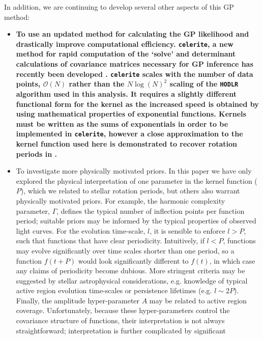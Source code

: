 \documentclass[a4paper,fleqn,usenatbib,useAMS]{mnras}
\begin{document}
In addition, we are continuing to develop several other aspects of this GP
method:
\begin{itemize}
    \item{{\bf To use an updated method for calculating the GP likelihood and
    drastically improve computational efficiency.
        {\tt celerite}, a new method for rapid computation of the `solve' and
        determinant calculations of covariance matrices necessary for GP
        inference has recently been developed \citep{Foremanmackey2017}.
        {\tt celerite} scales with the number of data points, $\mathcal{O}(N)$
        rather than the $N\log(N)^2$ scaling of the {\tt HODLR} algorithm used
        in this analysis.
        It requires a slightly different functional form for the kernel as the
        increased speed is obtained by using mathematical properties of
        exponential functions.
        Kernels must be written as the sums of exponentials in order to be
        implemented in {\tt celerite}, however a close approximation to the
        kernel function used here is demonstrated to recover rotation periods
        in \citet{Foremanmackey2017}.}}
\item{To investigate more physically motivated priors.
        In this paper we have only explored the physical interpretation of one
        parameter in the kernel function ($P$), which we related to stellar
        rotation periods, but others also warrant physically motivated priors.
        For example, the harmonic complexity parameter, $\Gamma$, defines the
        typical number of inflection points per function period; suitable
        priors may be informed by the typical properties of observed light
        curves.
        For the evolution time-scale, $l$,  it is sensible to enforce $l > P$,
        such that functions that have clear periodicity.
        Intuitively, if $l < P$, functions may evolve significantly over time
        scales shorter than one period, so a function $f(t+P)$ would look
        significantly different to $f(t)$, in which case any claims of
        periodicity become dubious.
        More stringent criteria may be suggested by stellar astrophysical
        considerations, e.g. knowledge of typical active region evolution
        time-scales or persistence lifetimes (e.g. $l\sim2P$).
        Finally, the amplitude hyper-parameter $A$ may be related to active
        region coverage.
        Unfortunately, because these hyper-parameters control the covariance
        structure of functions, their interpretation is not always
        straightforward; interpretation is further complicated by significant
}
\end{itemize}
\end{document}
